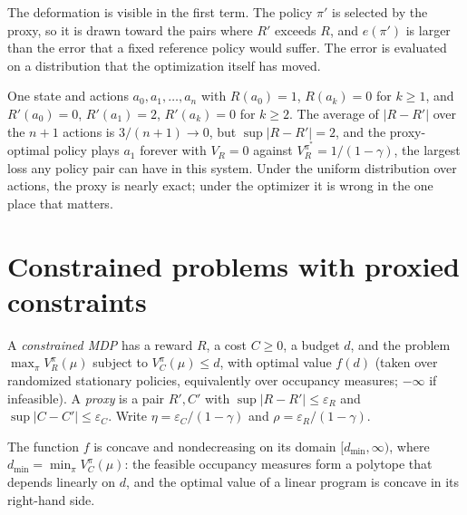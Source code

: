 The deformation is visible in the first term. The policy $\pi'$ is selected by the proxy, so it is drawn toward the pairs where $R'$ exceeds $R$, and $e(\pi')$ is larger than the error that a fixed reference policy would suffer. The error is evaluated on a distribution that the optimization itself has moved.

\begin{example}\label{ex:mean}
One state and actions $a_0,a_1,\dots,a_n$ with $R(a_0)=1$, $R(a_k)=0$ for $k\ge1$, and $R'(a_0)=0$, $R'(a_1)=2$, $R'(a_k)=0$ for $k\ge2$. The average of $|R-R'|$ over the $n+1$ actions is $3/(n+1)\to0$, but $\sup|R-R'|=2$, and the proxy-optimal policy plays $a_1$ forever with $V_R=0$ against $V_R^{\pi^*}=1/(1-\gamma)$, the largest loss any policy pair can have in this system. Under the uniform distribution over actions, the proxy is nearly exact; under the optimizer it is wrong in the one place that matters.
\end{example}

\section{Constrained problems with proxied constraints}

\begin{definition}\label{def:cmdp}
A \emph{constrained MDP} has a reward $R$, a cost $C\ge0$, a budget $d$, and the problem $\max_\pi V_R^\pi(\mu)$ subject to $V_C^\pi(\mu)\le d$, with optimal value $f(d)$ (taken over randomized stationary policies, equivalently over occupancy measures; $-\infty$ if infeasible). A \emph{proxy} is a pair $R',C'$ with $\sup|R-R'|\le\varepsilon_R$ and $\sup|C-C'|\le\varepsilon_C$. Write $\eta=\varepsilon_C/(1-\gamma)$ and $\rho=\varepsilon_R/(1-\gamma)$.
\end{definition}

The function $f$ is concave and nondecreasing on its domain $[d_{\min},\infty)$, where $d_{\min}=\min_\pi V_C^\pi(\mu)$: the feasible occupancy measures form a polytope that depends linearly on $d$, and the optimal value of a linear program is concave in its right-hand side.

